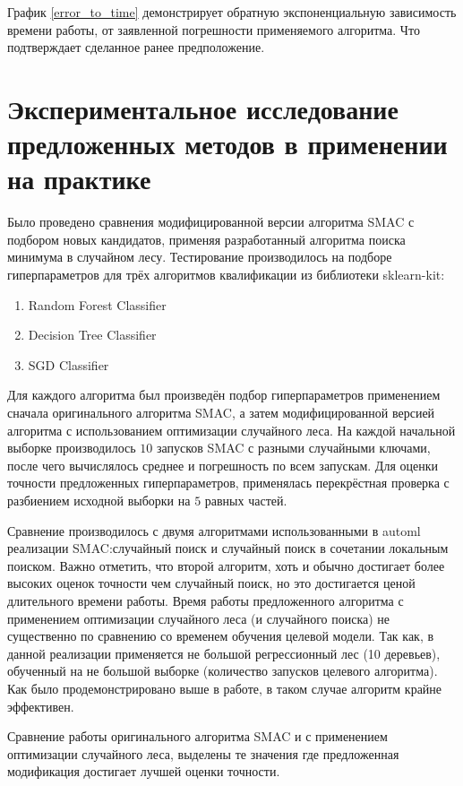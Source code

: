График \cref{error_to_time} демонстрирует обратную экспоненциальную зависимость
времени работы, от заявленной погрешности применяемого алгоритма. Что
подтверждает сделанное ранее предположение.

\section{Экспериментальное исследование предложенных методов в применении на
практике}\label{sec:test_smac}

Было проведено сравнения модифицированной версии алгоритма SMAC с подбором новых
кандидатов, применяя разработанный алгоритма поиска минимума в случайном лесу.
Тестирование производилось на подборе гиперпараметров для трёх алгоритмов
квалификации из библиотеки sklearn-kit:

\begin{enumerate}
    \item Random Forest Classifier
    \item Decision Tree Classifier
    \item SGD Classifier
\end{enumerate}

Для каждого алгоритма был произведён подбор гиперпараметров применением сначала
оригинального алгоритма SMAC, а затем модифицированной версией алгоритма
с использованием оптимизации случайного леса. На каждой начальной выборке
производилось $10$ запусков SMAC с разными случайными ключами, после чего
вычислялось среднее и погрешность по всем запускам. Для оценки точности
предложенных гиперпараметров, применялась перекрёстная проверка с разбиением
исходной выборки на $5$ равных частей.

Сравнение производилось с двумя алгоритмами использованными в automl реализации
SMAC:\@ случайный поиск и случайный поиск в сочетании локальным поиском. Важно
отметить, что второй алгоритм, хоть и обычно достигает более высоких оценок
точности чем случайный поиск, но это достигается ценой длительного времени
работы. Время работы предложенного алгоритма с применением оптимизации
случайного леса (и случайного поиска) не существенно по сравнению со временем
обучения целевой модели. Так как, в данной реализации применяется не большой
регрессионный лес (10 деревьев), обученный на не большой выборке (количество
запусков целевого алгоритма). Как было продемонстрировано выше в работе, в таком
случае алгоритм крайне эффективен.

\begin{table}[H]
\centering
\caption{Сравнение работы оригинального алгоритма SMAC и с применением оптимизации
случайного леса, выделены те значения где предложенная модификация достигает
лучшей оценки точности.}\label{smacgeneral}
\smacgeneral
\end{table}

